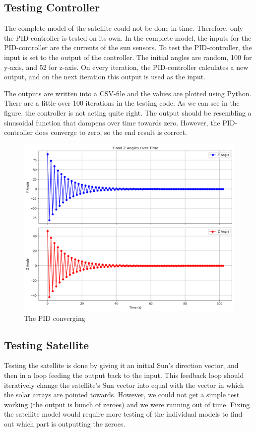 \subsection{Testing Controller}
The complete model of the satellite could not be done in time. Therefore, only the PID-controller is tested on its own. In the complete model, the inputs for the PID-controller are the currents of the sun sensors. To test the PID-controller, the input is set to the output of the controller. The initial angles are random, 100 for y-axis, and 52 for z-axis. On every iteration, the PID-controller calculates a new output, and on the next iteration this output is used as the input.

The outputs are written into a CSV-file and the values are plotted using Python. There are a little over 100 iterations in the testing code. As we can see in the figure, the controller is not acting quite right. The output should be resembling a sinusoidal function that dampens over time towards zero. However, the PID-controller does converge to zero, so the end result is correct.

\begin{figure}[H]
    \centering
    \includegraphics[width=1.0\linewidth]{doc//Graphics/y and z angles.png}
    \caption{The PID converging}
    \label{fig:pid}
\end{figure}

\subsection{Testing Satellite}
Testing the satellite is done by giving it an initial Sun's direction vector, and then in a loop feeding the output back to the input. This feedback loop should iteratively change the satellite's Sun vector into equal with the vector in which the solar arrays are pointed towards. However, we could not get a simple test working (the output is bunch of zeroes) and we were running out of time. Fixing the satellite model would require more testing of the individual models to find out which part is outputting the zeroes.